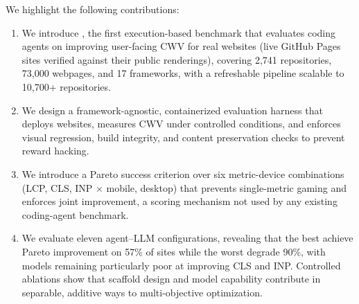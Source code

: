We highlight the following contributions:
\begin{enumerate}
    \item We introduce \OurBench, the first execution-based benchmark that evaluates coding agents on improving user-facing CWV for real websites (live GitHub Pages sites verified against their public renderings), covering 2{,}741 repositories, 73{,}000 webpages, and 17 frameworks, with a refreshable pipeline scalable to 10{,}700+ repositories.

    \item We design a framework-agnostic, containerized evaluation harness that deploys websites, measures CWV under controlled conditions, and enforces visual regression, build integrity, and content preservation checks to prevent reward hacking.

    \item We introduce a Pareto success criterion over six metric-device combinations (LCP, CLS, INP $\times$ mobile, desktop) that prevents single-metric gaming and enforces joint improvement, a scoring mechanism not used by any existing coding-agent benchmark.

    \item We evaluate eleven agent--LLM configurations, revealing that the best achieve Pareto improvement on 57\% of sites while the worst degrade 90\%, with models remaining particularly poor at improving CLS and INP. Controlled ablations show that scaffold design and model capability contribute in separable, additive ways to multi-objective optimization.
\end{enumerate}
